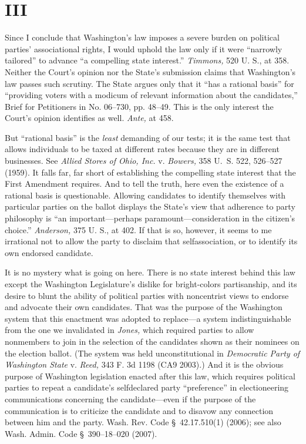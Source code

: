 \section{III}

  Since I conclude that Washington's law imposes a severe burden on
political parties' associational rights, I would uphold the law only
if it were ``narrowly tailored'' to advance ``a compelling state
interest.'' \emph{Timmons,} 520 U. S., at 358. Neither the Court's
opinion nor the State's submission claims that Washington's law
passes such scrutiny. The State ar\newpage gues only that it ``has a
rational basis'' for ``providing voters with a modicum of relevant
information about the candidates,'' Brief for Petitioners in No.
06--730, pp. 48--49. This is the only interest the Court's opinion
identifies as well. \emph{Ante,} at 458.

  But ``rational basis'' is the \emph{least} demanding of our tests;
it is the same test that allows individuals to be taxed at different
rates because they are in different businesses. See \emph{Allied Stores of
Ohio, Inc.} v. \emph{Bowers,} 358 U.~S. 522, 526--527 (1959). It falls
far, far short of establishing the compelling state interest that the
First Amendment requires. And to tell the truth, here even the existence
of a rational basis is questionable. Allowing candidates to identify
themselves with particular parties on the ballot displays the State's
view that adherence to party philosophy is ``an important---perhaps
paramount---consideration in the citizen's choice.'' \emph{Anderson,}
375 U. S., at 402. If that is so, however, it seems to me irrational
not to allow the party to disclaim that selfassociation, or to identify
its own endorsed candidate.

  It is no mystery what is going on here. There is no state interest
behind this law except the Washington Legislature's dislike for
bright-colors partisanship, and its desire to blunt the ability of
political parties with noncentrist views to endorse and advocate their
own candidates. That was the purpose of the Washington system that this
enactment was adopted to replace---a system indistinguishable from
the one we invalidated in \emph{Jones,} which required parties to allow
nonmembers to join in the selection of the candidates shown as their
nominees on the election ballot. (The system was held unconstitutional
in \emph{Democratic Party of Washington State} v. \emph{Reed,} 343 F.
3d 1198 (CA9 2003).) And it is the obvious purpose of Washington
legislation enacted after this law, which requires political parties
to repeat a candidate's selfdeclared party ``preference'' in
electioneering communications concerning the candidate---even if
the purpose of the communication is to criticize the candidate
and to disavow \newpage  any connection between him and the party.
Wash. Rev. Code \S~42.17.510(1) (2006); see also Wash. Admin. Code
\S~390--18--020 (2007).

